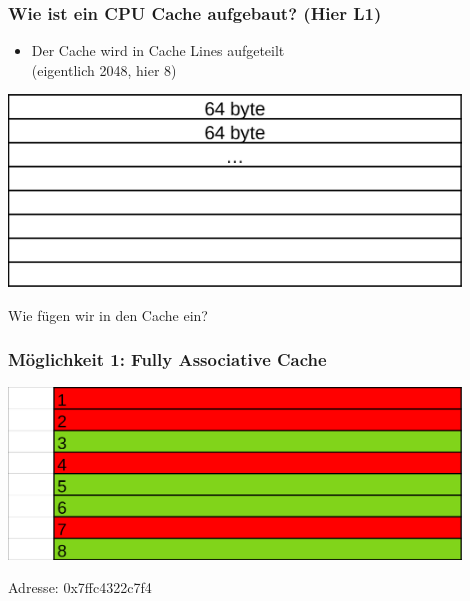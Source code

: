 \documentclass{beamer}
\begin{document}
\begin{frame}
\frametitle{Wie ist ein CPU Cache aufgebaut? (Hier L1)}
\begin{itemize}
    \item Der Cache wird in Cache Lines aufgeteilt\\(eigentlich 2048, hier 8)\\
\end{itemize}
\centerline{\includegraphics[width=12cm]{cell2.png}}
\end{frame}

\begin{frame}

{
\centering
\huge
Wie f\"ugen wir in den Cache ein?
}
\end{frame}

%
%
\begin{frame}
\frametitle{M\"oglichkeit 1: Fully Associative Cache}
\centerline{\includegraphics[width=12cm]{fac1.png}}
Adresse: 0x7ffc4322c7f4
\end{frame}
\end{document}
